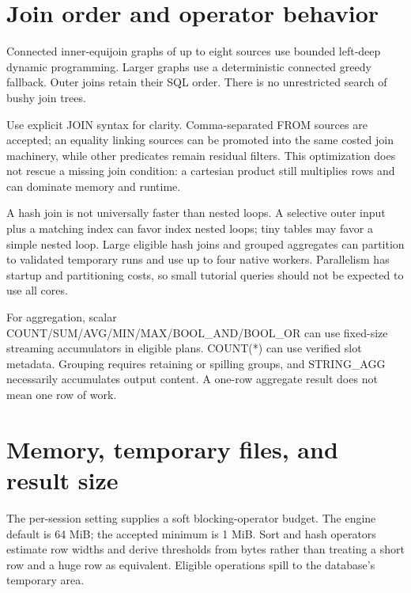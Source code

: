 
\section{Join order and operator behavior}

Connected inner-equijoin graphs of up to eight sources use bounded left-deep dynamic programming. Larger graphs use a deterministic connected greedy fallback. Outer joins retain their SQL order. There is no unrestricted search of bushy join trees.

Use explicit JOIN syntax for clarity. Comma-separated FROM sources are accepted; an equality linking sources can be promoted into the same costed join machinery, while other predicates remain residual filters. This optimization does not rescue a missing join condition: a cartesian product still multiplies rows and can dominate memory and runtime.

A hash join is not universally faster than nested loops. A selective outer input plus a matching index can favor index nested loops; tiny tables may favor a simple nested loop. Large eligible hash joins and grouped aggregates can partition to validated temporary runs and use up to four native workers. Parallelism has startup and partitioning costs, so small tutorial queries should not be expected to use all cores.

For aggregation, scalar COUNT/SUM/AVG/MIN/MAX/BOOL\_AND/BOOL\_OR can use fixed-size streaming accumulators in eligible plans. COUNT(*) can use verified slot metadata. Grouping requires retaining or spilling groups, and STRING\_AGG necessarily accumulates output content. A one-row aggregate result does not mean one row of work.

\section{Memory, temporary files, and result size}

The per-session  setting supplies a soft blocking-operator budget. The engine default is 64 MiB; the accepted minimum is 1 MiB. Sort and hash operators estimate row widths and derive thresholds from bytes rather than treating a short row and a huge row as equivalent. Eligible operations spill to the database's temporary area.

